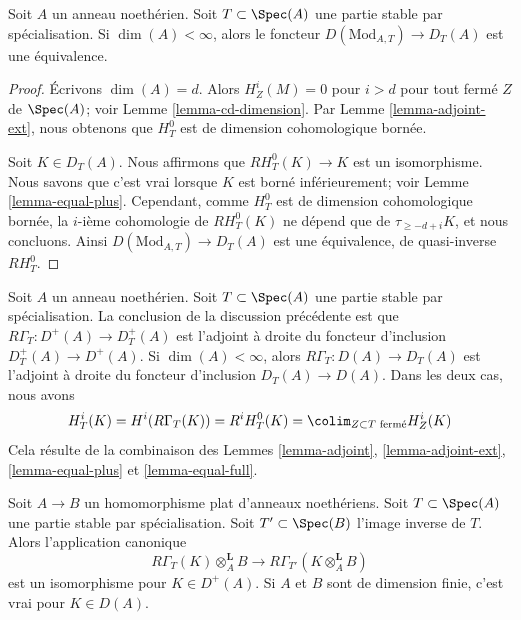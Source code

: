 \begin{lemma}
\label{lemma-equal-full}
Soit $A$ un anneau noethérien. Soit $T \subset \Spec(A)$ une partie stable
par spécialisation. Si $\dim(A) < \infty$, alors le foncteur
$D(\text{Mod}_{A, T}) \to D_T(A)$ est une équivalence.
\end{lemma}

\begin{proof}
Écrivons $\dim(A) = d$. Alors $H^i_Z(M) = 0$ pour $i > d$
pour tout fermé $Z$ de $\Spec(A)$; voir
Lemme \ref{lemma-cd-dimension}.
Par Lemme \ref{lemma-adjoint-ext}, nous obtenons que $H^0_T$ est de
dimension cohomologique bornée.

\medskip\noindent
Soit $K \in D_T(A)$. Nous affirmons que $RH^0_T(K) \to K$ est un
isomorphisme. Nous savons que c'est vrai lorsque $K$ est borné inférieurement; voir
Lemme \ref{lemma-equal-plus}. Cependant, comme $H^0_T$ est de dimension
cohomologique bornée, la $i$-ième cohomologie de
$RH_T^0(K)$ ne dépend que de $\tau_{\geq -d + i}K$, et nous concluons.
Ainsi $D(\text{Mod}_{A, T}) \to D_T(A)$ est une équivalence, de
quasi-inverse $RH^0_T$.
\end{proof}

\begin{remark}
\label{remark-upshot}
Soit $A$ un anneau noethérien. Soit $T \subset \Spec(A)$ une
partie stable par spécialisation.
La conclusion de la discussion précédente est que
$R\Gamma_T : D^+(A) \to D_T^+(A)$ est l'adjoint à droite
du foncteur d'inclusion $D_T^+(A) \to D^+(A)$.
Si $\dim(A) < \infty$, alors
$R\Gamma_T : D(A) \to D_T(A)$ est l'adjoint à droite
du foncteur d'inclusion $D_T(A) \to D(A)$.
Dans les deux cas, nous avons
$$
H^i_T(K) = H^i(R\Gamma_T(K)) = R^iH^0_T(K) =
\colim_{Z \subset T\text{ fermé}} H^i_Z(K)
$$
Cela résulte de la combinaison des
Lemmes \ref{lemma-adjoint}, \ref{lemma-adjoint-ext},
\ref{lemma-equal-plus} et \ref{lemma-equal-full}.
\end{remark}

\begin{lemma}
\label{lemma-torsion-change-rings}
Soit $A \to B$ un homomorphisme plat d'anneaux noethériens.
Soit $T \subset \Spec(A)$ une partie stable par spécialisation.
Soit $T' \subset \Spec(B)$ l'image inverse de $T$.
Alors l'application canonique
$$
R\Gamma_T(K) \otimes_A^\mathbf{L} B
\longrightarrow
R\Gamma_{T'}(K \otimes_A^\mathbf{L} B)
$$
est un isomorphisme pour $K \in D^+(A)$. Si $A$ et $B$ sont de
dimension finie, c'est vrai pour $K \in D(A)$.
\end{lemma}

